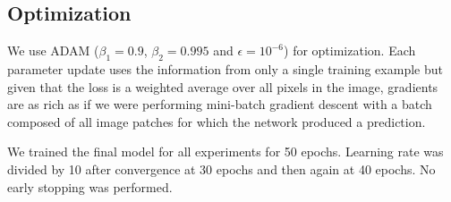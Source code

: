 \subsection{Optimization}
We use ADAM ($\beta_1 = 0.9$, $\beta_2 = 0.995$ and $\epsilon = 10^{-6}$) for optimization.
Each parameter update uses the information from only a single training example but given that the loss is a weighted average over all pixels in the image, gradients are as rich as if we were performing mini-batch gradient descent with a batch composed of all image patches for which the network produced a prediction.

We trained the final model for all experiments for 50 epochs. Learning rate was divided by 10 after convergence at 30 epochs and then again at 40 epochs. No early stopping was performed.

